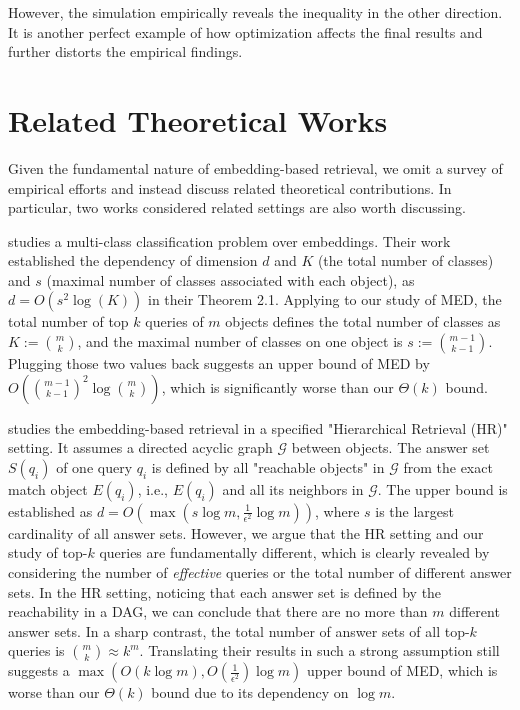 \documentclass[10pt]{article}
\begin{document}
However, the simulation empirically reveals the inequality in the other direction. It is another perfect example of how optimization affects the final results and further distorts the empirical findings.


\section{Related Theoretical Works}\label{sec:related}

Given the fundamental nature of embedding-based retrieval, we omit a survey of empirical efforts and instead discuss related theoretical contributions.
In particular, two works considered related settings are also worth discussing.

\cite{guo2019breaking} studies a multi-class classification problem over embeddings. Their work established the dependency of dimension $d$ and $K$ (the total number of classes) and $s$ (maximal number of classes associated with each object), as $d=O(s^2 \log (K))$ in their Theorem 2.1. Applying to our study of MED, the total number of top $k$ queries of $m$ objects defines the total number of classes as $K:=\binom{m}{k}$, and the maximal number of classes on one object is $s:=\binom{m-1}{k-1}$. Plugging those two values back suggests an upper bound of MED by $O(\binom{m-1}{k-1}^2 \log \binom{m}{k})$, which is significantly worse than our $\Theta(k)$ bound.

\cite{you2025hierarchical} studies the embedding-based retrieval in a specified "Hierarchical Retrieval (HR)" setting. It assumes a directed acyclic graph $\mathcal{G}$ between objects. The answer set $S(q_i)$ of one query $q_i$ is defined by all "reachable objects" in $\mathcal{G}$ from the exact match object $E(q_i)$, i.e., $E(q_i)$ and all its neighbors in $\mathcal{G}$. The upper bound is established as $d = O(\max(s\log m, \frac{1}{\epsilon^2} \log m))$, where $s$ is the largest cardinality of all answer sets. However, we argue that the HR setting and our study of top-$k$ queries are fundamentally different, which is clearly revealed by considering the number of \textit{effective} queries or the total number of different answer sets.  In the HR setting, noticing that each answer set is defined by the reachability in a DAG, we can conclude that there are no more than $m$ different answer sets. In a sharp contrast, the total number of answer sets of all top-$k$ queries is $\binom{m}{k} \approx k^m$. Translating their results in such a strong assumption still suggests a $\max(O(k\log m), O(\frac{1}{\epsilon^2})\log m)$ upper bound of MED, which is worse than our $\Theta(k)$ bound due to its dependency on $\log m$.
\end{document}
